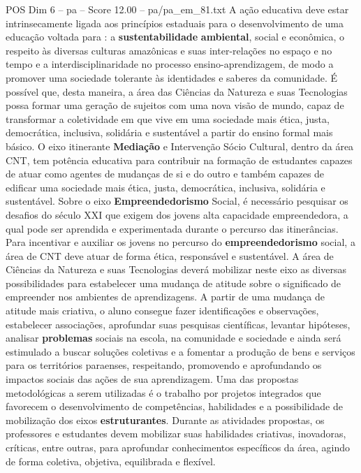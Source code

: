 \begin{textsample}{POS Dim 6 – pa – Score 12.00 – pa/pa\_em\_81.txt}
A ação educativa deve estar intrinsecamente ligada aos princípios estaduais para o desenvolvimento de uma educação voltada para : a \textbf{sustentabilidade} \textbf{ambiental}, social e econômica, o respeito às diversas culturas amazônicas e suas inter-relações no espaço e no tempo e a interdisciplinaridade no processo ensino-aprendizagem, de modo a promover uma sociedade tolerante às identidades e saberes da comunidade.
É possível que, desta maneira, a área das Ciências da Natureza e suas Tecnologias possa formar uma geração de sujeitos com uma nova visão de mundo, capaz de transformar a coletividade em que vive em uma sociedade mais ética, justa, democrática, inclusiva, solidária e sustentável a partir do ensino formal mais básico.
O eixo itinerante \textbf{Mediação} e Intervenção Sócio Cultural, dentro da área CNT, tem potência educativa para contribuir na formação de estudantes capazes de atuar como agentes de mudanças de si e do outro e também capazes de edificar uma sociedade mais ética, justa, democrática, inclusiva, solidária e sustentável.
Sobre o eixo \textbf{Empreendedorismo} Social, é necessário pesquisar os desafios do século XXI que exigem dos jovens alta capacidade empreendedora, a qual pode ser aprendida e experimentada durante o percurso das itinerâncias.
Para incentivar e auxiliar os jovens no percurso do \textbf{empreendedorismo} social, a área de CNT deve atuar de forma ética, responsável e sustentável.
A área de Ciências da Natureza e suas Tecnologias deverá mobilizar neste eixo as diversas possibilidades para estabelecer uma mudança de atitude sobre o significado de empreender nos ambientes de aprendizagens.
A partir de uma mudança de atitude mais criativa, o aluno consegue fazer identificações e observações, estabelecer associações, aprofundar suas pesquisas científicas, levantar hipóteses, analisar \textbf{problemas} sociais na escola, na comunidade e sociedade e ainda será estimulado a buscar soluções coletivas e a fomentar a produção de bens e serviços para os territórios paraenses, respeitando, promovendo e aprofundando os impactos sociais das ações de sua aprendizagem.
Uma das propostas metodológicas a serem utilizadas é o trabalho por projetos integrados que favorecem o desenvolvimento de competências, habilidades e a possibilidade de mobilização dos eixos \textbf{estruturantes}.
Durante as atividades propostas, os professores e estudantes devem mobilizar suas habilidades criativas, inovadoras, críticas, entre outras, para aprofundar conhecimentos específicos da área, agindo de forma coletiva, objetiva, equilibrada e flexível.

\end{textsample}
